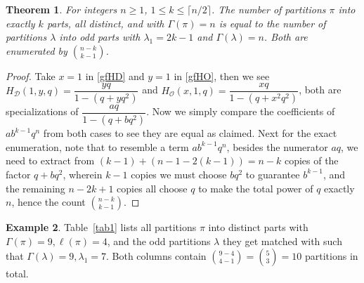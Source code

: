 \documentclass[12pt]{amsart}
\numberwithin{equation}{section}
\theoremstyle{plain}
\newtheorem{theorem}{Theorem}[section]
\theoremstyle{definition}
\newtheorem{example}[theorem]{Example}
\def\D{\mathcal{D}}
\def\O{\mathcal{O}}
\begin{document}
\begin{theorem}\label{ref1}
For integers $n\geq 1$, $1\leq k \leq \lceil n/2\rceil$. The number of partitions $\pi$ into exactly $k$ parts, all distinct, and with $\Gamma(\pi)=n$ is equal to the number of partitions $\lambda$ into odd parts with $\lambda_1=2k-1$ and $\Gamma(\lambda)=n$. Both are enumerated by $\binom{n-k}{k-1}$.
\end{theorem}
\begin{proof}
Take $x=1$ in \eqref{gfHD} and $y=1$ in \eqref{gfHO}, then we see $H_{\D}(1,y,q)=\dfrac{yq}{1-(q+yq^2)}$ and $H_{\O}(x,1,q)=\dfrac{xq}{1-(q+x^2q^2)}$, both are specializations of $\dfrac{aq}{1-(q+bq^2)}$. Now we simply compare the coefficients of $ab^{k-1}q^n$ from both cases to see they are equal as claimed. Next for the exact enumeration, note that to resemble a term $ab^{k-1}q^n$, besides the numerator $aq$, we need to extract from $(k-1)+(n-1-2(k-1))=n-k$ copies of the factor $q+bq^2$, wherein $k-1$ copies we must choose $bq^2$ to guarantee $b^{k-1}$, and the remaining $n-2k+1$ copies all choose $q$ to make the total power of $q$ exactly $n$, hence the count $\binom{n-k}{k-1}$.
\end{proof}
\begin{example}
Table~\ref{tab1} lists all partitions $\pi$ into distinct parts with $\Gamma(\pi)=9, \ell(\pi)=4$, and the odd partitions $\lambda$ they get matched with such that $\Gamma(\lambda)=9, \lambda_{1}=7$. Both columns contain $\binom{9-4}{4-1}=\binom{5}{3}=10$ partitions in total.
\end{example}
\end{document}
